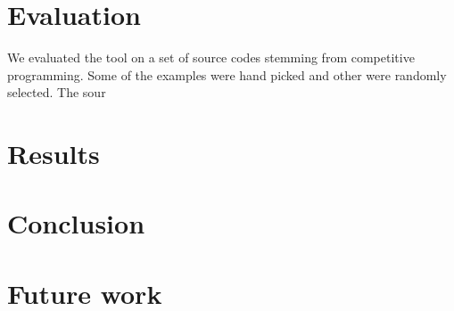 \documentclass[12pt]{article}
\begin{document}
\section{Evaluation}

We evaluated the tool on a set of source codes stemming from competitive programming. Some of the examples were hand picked and other were randomly selected. The sour

\section{Results}

\section{Conclusion}

\section{Future work}



\end{document}
